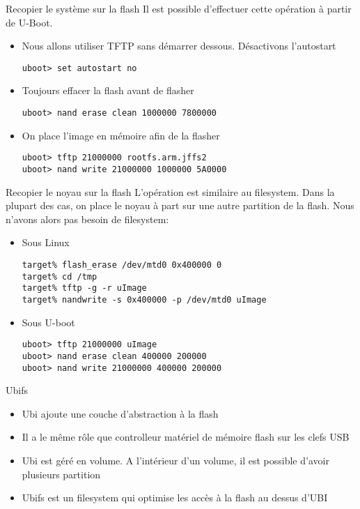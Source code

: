 \begin{frame}[fragile=singleslide]{Recopier le système sur la flash}
  Il est possible d'effectuer cette opération à partir de U-Boot.
  \begin{itemize} 
  \item Nous allons utiliser TFTP sans démarrer dessous. Désactivons l'autostart
    \begin{lstlisting} 
uboot> set autostart no
    \end{lstlisting} 
  \item Toujours effacer la flash avant de flasher
    \begin{lstlisting} 
uboot> nand erase clean 1000000 7800000
    \end{lstlisting} 
  \item On place l'image en mémoire afin de la flasher
    \begin{lstlisting} 
uboot> tftp 21000000 rootfs.arm.jffs2
uboot> nand write 21000000 1000000 5A0000
    \end{lstlisting} 
  \end{itemize}
\end{frame}

\begin{frame}[fragile=singleslide]{Recopier le noyau sur la flash}
  L'opération est similaire au filesystem. Dans la plupart des cas, on
  place le  noyau à  part sur  une autre partition  de la  flash. Nous
  n'avons alors pas besoin de filesystem:
  \begin{itemize} 
  \item Sous Linux
    \begin{lstlisting}
target% flash_erase /dev/mtd0 0x400000 0
target% cd /tmp
target% tftp -g -r uImage
target% nandwrite -s 0x400000 -p /dev/mtd0 uImage 
    \end{lstlisting}
  \item Sous U-boot
    \begin{lstlisting} 
uboot> tftp 21000000 uImage
uboot> nand erase clean 400000 200000
uboot> nand write 21000000 400000 200000
    \end{lstlisting} 
  \end{itemize}
\end{frame}

\begin{frame}[fragile=singleslide]{Ubifs}
  \begin{itemize}
  \item Ubi ajoute une couche d'abstraction à la flash
  \item Il a le même rôle que controlleur matériel de mémoire flash sur les clefs USB
  \item Ubi est géré en volume. A l'intérieur d'un volume, il est possible d'avoir plusieurs partition
  \item Ubifs est un filesystem qui optimise les accès à la flash au dessus d'UBI
  \end{itemize}
\end{frame}

